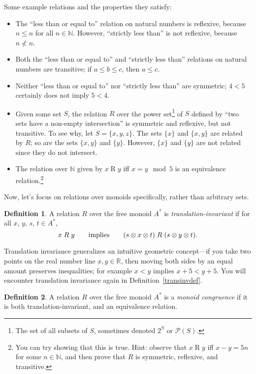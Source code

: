 \documentclass[headsepline,bibliography=totoc]{scrreport}
\theoremstyle{definition}
\theoremstyle{definition}
\newtheorem{definition}{Definition}[chapter]
\theoremstyle{definition}
\begin{document}
Some example relations and the properties they satisfy:
\begin{itemize}
\item The ``less than or equal to'' relation on natural numbers is reflexive, because $n\le n$ for all $n\in\mathbb{N}$. However, ``strictly less than'' is not reflexive, because $n \nless n$.
\item Both the ``less than or equal to'' and ``strictly less than'' relations on natural numbers are transitive; if $a\le b\le c$, then $a\le c$.
\item Neither ``less than or equal to'' nor ``strictly less than'' are symmetric; $4 < 5$ certainly does not imply $5 < 4$.
\item Given some set $S$, the relation $R$ over the power set\footnote{The set of all subsets of $S$, sometimes denoted $2^S$ or $\mathcal{P}(S)$.} of $S$ defined by ``two sets have a non-empty intersection'' is symmetric and reflexive, but not transitive. To see why, let $S=\{x, y, z\}$. The sets $\{x\}$ and $\{x, y\}$ are related by $R$; so are the sets $\{x, y\}$ and $\{y\}$. However, $\{x\}$ and $\{y\}$ are not related since they do not intersect.
\item The relation over $\mathbb{N}$ given by $x\mathrel{R}y$ iff $x=y \mod 5$ is an equivalence relation.\footnote{You can try showing that this is true. Hint: observe that $x\mathrel{R}y$ iff $x-y=5n$ for some $n\in\mathbb{N}$, and then prove that $R$ is symmetric, reflexive, and transitive.}
\end{itemize}
Now, let's focus on relations over monoids specifically, rather than arbitrary sets.
\begin{definition}\label{transinv} A relation $R$ over the free monoid $A^*$ is \emph{translation-invariant} if for all $x$, $y$, $s$, $t\in A^*$,
\[x\mathrel{R}y\qquad\hbox{implies}\qquad (s\otimes x\otimes t)\mathrel{R}(s\otimes y\otimes t).\]
\end{definition}

Translation invariance generalizes an intuitive geometric concept---if you take two points on the real number line $x,y\in\mathbb{R}$, then moving both sides by an equal amount preserves inequalities; for example $x<y$ implies $x+5<y+5$. You will encounter translation invariance again in Definition~\ref{transinvdef}.

\begin{definition} A relation $R$ over the free monoid $A^*$ is a \emph{monoid congruence} if it is both translation-invariant, and an equivalence relation.
\end{definition}
\end{document}
